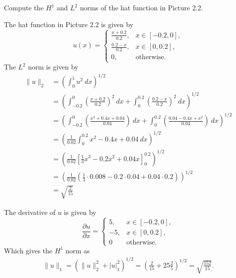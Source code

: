 \begin{exercise}
    Compute the $H^1$ and $L^2$ norms of the hat function in Picture 2.2.
\end{exercise}

\begin{solution}
    The hat function in Picture 2.2 is given by
    \begin{equation*}
        u(x) =
        \begin{cases}
            \frac{x + 0.2}{0.2}, & x \in [-0.2, 0], \\
            \frac{0.2 - x}{0.2}, & x \in [0, 0.2], \\
            0, & \text{otherwise}.
        \end{cases}
    \end{equation*}
    The $L^2$ norm is given by
    \begin{align*}
        \lVert u \rVert_2 &= \left( \int_{0}^{1} u^2 \ dx \right)^{1/2} \\
        &= \left( \int_{-0.2}^{0} \left( \frac{x + 0.2}{0.2} \right)^2 \ dx + \int_{0}^{0.2} \left( \frac{0.2 - x}{0.2} \right)^2 \ dx \right)^{1/2} \\
        &= \left( \int_{-0.2}^{0} \left( \frac{x^2 + 0.4x + 0.04}{0.04} \right) \ dx + \int_{0}^{0.2} \left( \frac{0.04 - 0.4x + x^2}{0.04} \right) \ dx \right)^{1/2} \\
        &= \left(
            \frac{1}{0.02} \int_{0}^{0.2} x^2 - 0.4x + 0.04 \ dx
        \right)^{1/2} \\
        &= \left(
            \frac{1}{0.02} \left[ \frac{1}{3} x^3 - 0.2x^2 + 0.04x \right]_0^{0.2}
        \right)^{1/2} \\
        &= \left(
            \frac{1}{0.02} \left( \frac{1}{3} \cdot 0.008 - 0.2 \cdot 0.04 + 0.04 \cdot 0.2 \right)
        \right)^{1/2} \\
        &= \sqrt{\frac{2}{15}}
    \end{align*}

    The derivative of $u$ is given by
    \begin{equation*}
        \frac{\partial u}{\partial x} =
        \begin{cases}
            5, & x \in [-0.2, 0], \\
            -5, & x \in [0, 0.2], \\
            0 & \text{otherwise}.
        \end{cases}
    \end{equation*}
    Which gives the $H^1$ norm as
    \begin{align*}
        \lVert u \rVert_1 = \left( \lVert u \rVert_2^2 + \lvert u \rvert_1^2 \right)^{1/2}
        = \left( \frac{2}{15} + 25 \frac{2}{5} \right)^{1/2}
        = \sqrt{\frac{152}{15}}.
    \end{align*}
\end{solution}

